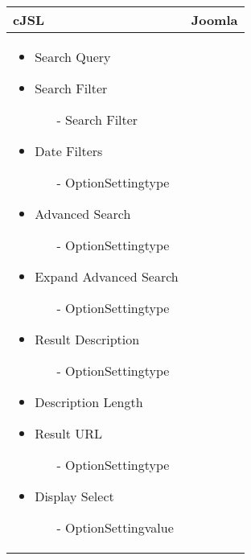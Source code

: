 \begin{minipage}{0.7\textwidth}
\begin{tabular}{|p{} | p{}|}
\hline
\textbf{cJSL} & \textbf{Joomla} \\ 
\hline
\begin{itemize}
\item Search Query
\item Search Filter
 \begin{enumerate}
 \item[-]  Search Filter
 \end{enumerate}
\item Date Filters
\begin{enumerate}
 	\item[-] OptionSettingtype
 \end{enumerate} 
\item Advanced Search
\begin{enumerate}
 	\item[-] OptionSettingtype
 \end{enumerate} 
\item Expand Advanced Search
\begin{enumerate}
 	\item[-] OptionSettingtype
 \end{enumerate} 
\item Result Description
\begin{enumerate}
 	\item[-] OptionSettingtype
 \end{enumerate} 
\item Description Length 
\item Result URL
\begin{enumerate}
 	\item[-] OptionSettingtype
 \end{enumerate}
\item Display Select
\begin{enumerate}
 	\item[-] OptionSettingvalue
 \end{enumerate} 
\end{itemize}


\end{tabular}
\end{minipage}
